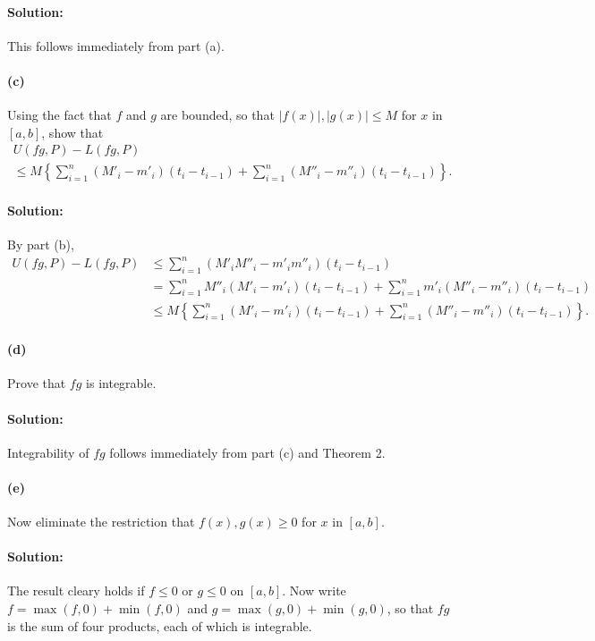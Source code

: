 \documentclass{article}
\begin{document}
\paragraph{Solution:} This follows immediately from part (a).

\paragraph{(c)} Using the fact that $f$ and $g$ are bounded, so that $|f(x)|,
|g(x)| \leq M$ for $x$ in $[a, b]$, show that \begin{multline*}
  U(fg, P) - L(fg, P) \\
    \leq M\left\{\sum_{i = 1}^n (M'_i - m'_i)(t_i - t_{i - 1})
      + \sum_{i = 1}^n (M''_i - m''_i)(t_i - t_{i - 1})\right\}.
\end{multline*}

\paragraph{Solution:} By part (b), \begin{align*}
  U(fg, P) - L(fg, P)
    &\leq \sum_{i = 1}^n (M'_iM''_i - m'_im''_i)(t_i - t_{i - 1}) \\
    &= \sum_{i = 1}^n M''_i(M'_i - m'_i)(t_i - t_{i - 1})
      + \sum_{i = 1}^n m'_i(M''_i - m''_i)(t_i - t_{i - 1}) \\
    &\leq M\left\{\sum_{i = 1}^n (M'_i - m'_i)(t_i - t_{i - 1})
      + \sum_{i = 1}^n (M''_i - m''_i)(t_i - t_{i - 1})\right\}.
\end{align*}

\paragraph{(d)} Prove that $fg$ is integrable.

\paragraph{Solution:} Integrability of $fg$ follows immediately from part (c)
and Theorem 2.

\paragraph{(e)} Now eliminate the restriction that $f(x), g(x) \geq 0$ for $x$
in $[a, b]$.

\paragraph{Solution:} The result cleary holds if $f \leq 0$ or $g \leq 0$ on
$[a, b]$. Now write $f = \max(f, 0) + \min(f, 0)$ and $g = \max(g, 0) + \min(g,
0)$, so that $fg$ is the sum of four products, each of which is integrable.
\end{document}
